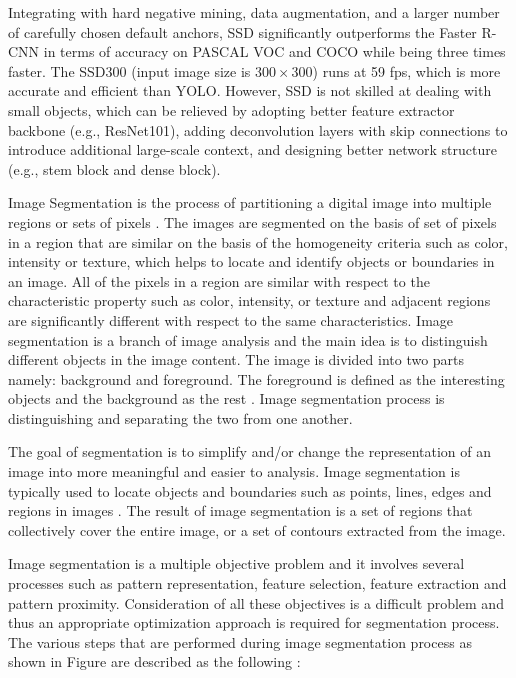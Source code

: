 \documentclass[two column]{ieeeaccess}
\begin{document}
\begin{itemize}
    Integrating with hard negative mining, data augmentation, and a larger number of carefully chosen default anchors, SSD significantly outperforms the Faster R-CNN in terms of accuracy on PASCAL VOC and COCO while being three times faster. The SSD300 (input image size is $300 \times 300$) runs at 59 fps, which is more accurate and efficient than YOLO. However, SSD is not skilled at dealing with small objects, which can be relieved by adopting better feature extractor backbone (e.g., ResNet101), adding deconvolution layers with skip connections to introduce additional large-scale context, and designing better network structure (e.g., stem block and dense block).
    
\end{itemize}


 Image Segmentation is the process of partitioning a digital image into multiple regions or sets of pixels \cite{25}. The images are segmented on the basis of set of pixels in a region that are similar on the basis of the homogeneity criteria such as color, intensity or texture, which helps to locate and identify objects or boundaries in an image. All of the pixels in a region are similar with respect to the characteristic property such as color, intensity, or texture and adjacent regions are significantly different with respect to the same characteristics. Image segmentation is a branch of image analysis and the main idea is to distinguish different objects in the image content. The image is divided into two parts namely: background and foreground. The foreground is defined as the interesting objects and the background as the rest \cite{26}. Image segmentation process is distinguishing and separating the two from one another.

 The goal of segmentation is to simplify and/or change the representation of an image into more meaningful and easier to analysis. Image segmentation is typically used to locate objects and boundaries such as points, lines, edges and regions in images \cite{27}. The result of image segmentation is a set of regions that collectively cover the entire image, or a set of contours extracted from the image.

 Image segmentation is a multiple objective problem and it involves several processes such as pattern representation, feature selection, feature extraction and pattern proximity. Consideration of all these objectives is a difficult problem and thus an appropriate optimization approach is required for segmentation process. The various steps that are performed during image segmentation process as shown in Figure  are described as the following \cite{28}:
\end{document}
